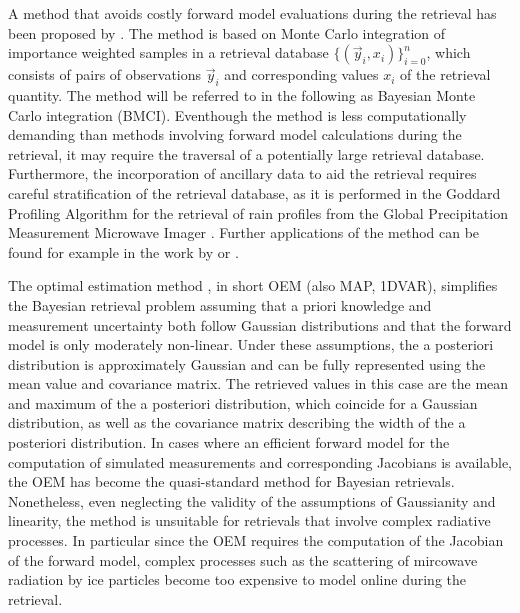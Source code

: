 \documentclass[journal abbreviation, manuscript]{copernicus}
\begin{document}
A method that avoids costly forward model evaluations during the retrieval has
been proposed by \cite{kummerow_1}. The method is based on Monte Carlo
integration of importance weighted samples in a retrieval database
$\{(\vec{y}_i, x_i)\}_{i = 0}^n$, which consists of pairs of observations
$\vec{y}_i$ and corresponding values $x_i$ of the retrieval quantity. The
method will be referred to in the following as Bayesian Monte Carlo integration
(BMCI). Eventhough the method is less computationally demanding than methods
involving forward model calculations during the retrieval, it may require the
traversal of a potentially large retrieval database. Furthermore, the
incorporation of ancillary data to aid the retrieval requires careful
stratification of the retrieval database, as it is performed in the Goddard
Profiling Algorithm \citep{gprof} for the retrieval of rain profiles from the
Global Precipitation Measurement Microwave Imager \citep{gmi}. Further
applications of the method can be found for example in the work by
\cite{rydberg_2} or \cite{evans_2}.

The optimal estimation method \citep{rodgers}, in short OEM (also MAP, 1DVAR),
simplifies the Bayesian retrieval problem assuming that a priori knowledge and
measurement uncertainty both follow Gaussian distributions and that the forward
model is only moderately non-linear. Under these assumptions, the a posteriori
distribution is approximately Gaussian and can be fully represented using the
mean value and covariance matrix. The retrieved values in this case are the mean
and maximum of the a posteriori distribution, which coincide for a Gaussian
distribution, as well as the covariance matrix describing the width of the a
posteriori distribution. In cases where an efficient forward model for the
computation of simulated measurements and corresponding Jacobians is available,
the OEM has become the quasi-standard method for Bayesian retrievals.
Nonetheless, even neglecting the validity of the assumptions of Gaussianity and
linearity, the method is unsuitable for retrievals that involve complex
radiative processes. In particular since the OEM requires the computation of the
Jacobian of the forward model, complex processes such as the scattering of
mircowave radiation by ice particles become too expensive to model online during
the retrieval.
\end{document}
